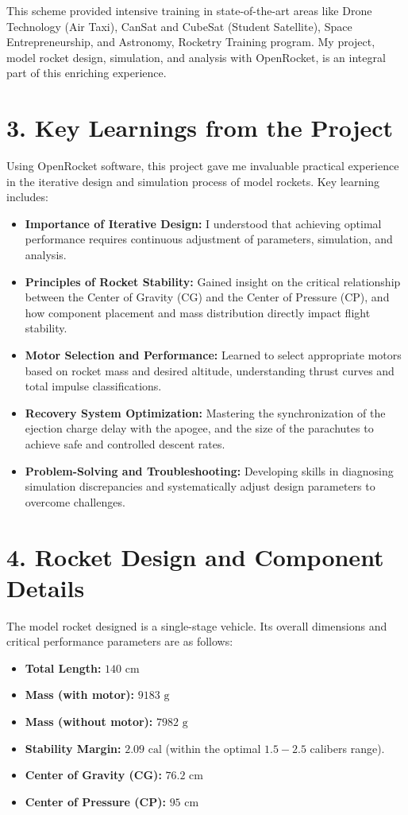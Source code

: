 \documentclass[12pt, a4paper]{article}
\begin{document}
This scheme provided intensive training in state-of-the-art areas like Drone Technology (Air Taxi), CanSat and CubeSat (Student Satellite), Space Entrepreneurship, and Astronomy, Rocketry Training program. My project, model rocket design, simulation, and analysis with OpenRocket, is an integral part of this enriching experience. 

\section*{3. Key Learnings from the Project}
Using OpenRocket software, this project gave me invaluable practical experience in the iterative design and simulation process of model rockets. Key learning includes:
\begin{itemize}
    \item \textbf{Importance of Iterative Design:} I understood that achieving optimal performance requires continuous adjustment of parameters, simulation, and analysis.
    \item \textbf{Principles of Rocket Stability:} Gained insight on the critical relationship between the Center of Gravity (CG) and the Center of Pressure (CP), and how component placement and mass distribution directly impact flight stability.
    \item \textbf{Motor Selection and Performance:} Learned to select appropriate motors based on rocket mass and desired altitude, understanding thrust curves and total impulse classifications.
    \item \textbf{Recovery System Optimization:} Mastering the synchronization of the ejection charge delay with the apogee, and the size of the parachutes to achieve safe and controlled descent rates.
    \item \textbf{Problem-Solving and Troubleshooting:} Developing skills in diagnosing simulation discrepancies and systematically adjust design parameters to overcome challenges.
\end{itemize}

\section*{4. Rocket Design and Component Details}
The model rocket designed is a single-stage vehicle. Its overall dimensions and critical performance parameters are as follows:
\begin{itemize}
    \item \textbf{Total Length:} $140 \text{ cm}$
    \item \textbf{Mass (with motor):} $9183 \text{ g}$
    \item \textbf{Mass (without motor):} $7982 \text{ g}$
    \item \textbf{Stability Margin:} $2.09 \text{ cal}$ (within the optimal $1.5-2.5$ calibers range).
    \item \textbf{Center of Gravity (CG):} $76.2 \text{ cm}$
    \item \textbf{Center of Pressure (CP):} $95 \text{ cm}$
\end{itemize}
\end{document}
